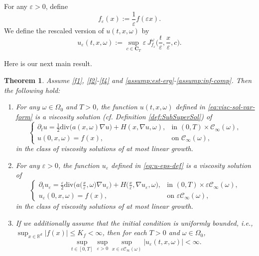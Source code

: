 \documentclass[11pt]{article}
\newcommand{\R}{\mathbb R}
\newcommand{\eps}{\varepsilon}
\newtheorem{theorem}{Theorem}[section]
\theoremstyle{rem}
\begin{document}
For any $\eps>0$, define
\[
f_\eps(x):=\frac{1}{\eps}f(\eps x).
\]
We define the rescaled version of $u(t,x,\omega)$ by
\begin{equation}\label{eq:u-eps-def}
u_\eps(t,x,\omega)
:=
\sup_{c\in\mathbf C_T}
\eps\,
J^\omega_{f_\eps}
\bigg(
\frac t\eps,
\frac x\eps,
c
\bigg).
\end{equation}

Here is our next main result.

\begin{theorem}\label{theorem 2}
Assume \ref{f1}, \ref{f2}-\ref{f4} and
\ref{assump:est-erg}-\ref{assump:inf-comp}. Then the following hold:
\begin{enumerate}

\item
For any $\omega\in\Omega_0$ and $T>0$, the function
$u(t,x,\omega)$ defined in \eqref{eq:visc-sol-var-form} is a viscosity solution
(cf. Definition \ref{def:SubSuperSol}) of
\begin{equation}\label{eq HJB eps 1}
\begin{cases}
\partial_t u
=
\frac12\mathrm{div}\big(a(x,\omega)\nabla u\big)
+
H(x,\nabla u,\omega),
&\text{in } (0,T)\times\mathcal C_\infty(\omega),
\\
u(0,x,\omega)=f(x),
&\text{on } \mathcal C_\infty(\omega),
\end{cases}
\end{equation}
in the class of viscosity solutions of at most linear growth.

\item
For any $\eps>0$, the function $u_\eps$ defined in \eqref{eq:u-eps-def} is a viscosity solution of
\begin{equation}\label{eq-HJB'}
\begin{cases}
\partial_t u_\eps
=
\frac{\eps}{2}
\mathrm{div}\big(a\big(\frac x\eps,\omega\big)\nabla u_\eps\big)
+
H\big(\frac x\eps,\nabla u_\eps,\omega\big),
&\text{in } (0,T)\times\eps\mathcal C_\infty(\omega),
\\
u_\eps(0,x,\omega)=f(x),
&\text{on } \eps\mathcal C_\infty(\omega),
\end{cases}
\end{equation}
in the class of viscosity solutions of at most linear growth.

\item
If we additionally assume that the initial condition is uniformly bounded, i.e.,
$\sup_{x\in\R^d}|f(x)|\leq K_f<\infty$, then for each $T>0$ and
$\omega\in\Omega_0$,
\begin{equation}
\sup_{t\in[0,T]}
\sup_{\eps>0}
\sup_{x\in\eps\mathcal C_\infty(\omega)}
|u_\eps(t,x,\omega)|
<\infty.
\end{equation}

\end{enumerate}
\end{theorem}
\end{document}
